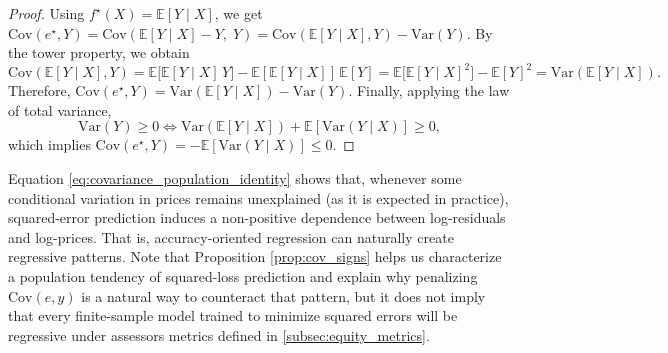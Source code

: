 \documentclass[12pt, draft]{article}
\theoremstyle{plain}
\theoremstyle{definition}
\newcommand{\E}{\mathbb{E}}
\newcommand{\1}{\mathbf{1}}
\newcommand{\Cov}{\text{Cov}}
\newcommand{\Var}{\text{Var}}
\begin{document}
{\begin{proof}
Using $f^\star(X)=\E[Y\mid X]$, we get
$
\Cov(e^\star,Y)
=
\Cov(\E[Y\mid X]-Y,\;Y)
=
\Cov(\E[Y\mid X],Y)-\Var(Y).
$
By the tower property, we obtain
\[
\Cov(\E[Y\mid X],Y)
=
\E\!\big[\E[Y\mid X]\,Y\big]-\E[\E[Y\mid X]]\,\E[Y]
=
\E\!\big[\E[Y\mid X]^2\big]-\E[Y]^2
=
\Var(\E[Y\mid X]).
\]
Therefore,
$
\Cov(e^\star,Y)=\Var(\E[Y\mid X])-\Var(Y).
$
Finally, applying the law of total variance,
\[
\Var(Y)\geq 0  \iff \Var(\E[Y\mid X])+\E[\Var(Y\mid X)] \geq 0,
\]
which implies
$
\Cov(e^\star,Y)
=
-\E\!\left[\Var(Y\mid X)\right]
\le 0.
$
\end{proof}

Equation \eqref{eq:covariance_population_identity} shows that, whenever some conditional variation in prices remains unexplained (as it is expected in practice), squared-error prediction induces a non-positive dependence between log-residuals and log-prices. That is, accuracy-oriented regression can naturally create regressive patterns. Note that Proposition \ref{prop:cov_signs} helps us characterize a population tendency of squared-loss prediction and explain why penalizing $\Cov(e,y)$ is a natural way to counteract that pattern, but it does not imply that every finite-sample model trained to minimize squared errors will be regressive under assessors metrics defined in \ref{subsec:equity_metrics}. 


}
\end{document}
